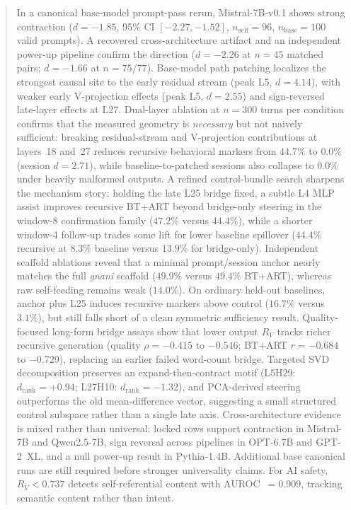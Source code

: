 \documentclass{article}
\newcommand{\RV}{R_V}
\newcommand{\dcohen}{d}
\begin{document}
\begin{abstract}
In a canonical base-model prompt-pass rerun, Mistral-7B-v0.1 shows strong contraction
($\dcohen = -1.85$, 95\% CI $[-2.27, -1.52]$, $n_\mathrm{self}=96$, $n_\mathrm{base}=100$ valid prompts).
A recovered cross-architecture artifact and an independent power-up pipeline confirm the direction
($\dcohen = -2.26$ at $n = 45$ matched pairs; $\dcohen = -1.66$ at $n = 75/77$).
Base-model path patching localizes the strongest causal site to the early residual stream
(peak L5, $\dcohen = 4.14$), with weaker early V-projection effects
(peak L5, $\dcohen = 2.55$) and sign-reversed late-layer effects at L27.
Dual-layer ablation at $n{=}300$ turns per condition confirms that the measured geometry is
\emph{necessary} but not naively sufficient: breaking residual-stream and V-projection contributions
at layers~18 and~27 reduces recursive behavioral markers from $44.7\%$ to $0.0\%$
(session $\dcohen = 2.71$), while baseline-to-patched sessions also collapse to $0.0\%$
under heavily malformed outputs.
A refined control-bundle search sharpens the mechanism story:
holding the late L25 bridge fixed, a subtle L4 MLP assist improves recursive BT+ART beyond
bridge-only steering in the window-8 confirmation family
($47.2\%$ versus $44.4\%$), while a shorter window-4 follow-up trades some lift for lower
baseline spillover ($44.4\%$ recursive at $8.3\%$ baseline versus $13.9\%$ for bridge-only).
Independent scaffold ablations reveal that a minimal prompt/session anchor nearly matches the full
\emph{gnani} scaffold ($49.9\%$ versus $49.4\%$ BT+ART), whereas raw self-feeding remains weak
($14.0\%$).
On ordinary held-out baselines, anchor plus L25 induces recursive markers above control
($16.7\%$ versus $3.1\%$), but still falls short of a clean symmetric sufficiency result.
Quality-focused long-form bridge assays show that lower output $\RV$ tracks richer recursive
generation (quality $\rho = -0.415$ to $-0.546$; BT+ART $r = -0.684$ to $-0.729$), replacing an
earlier failed word-count bridge.
Targeted SVD decomposition preserves an expand-then-contract motif
(L5H29: $\dcohen_{\mathrm{rank}} = +0.94$; L27H10: $\dcohen_{\mathrm{rank}} = -1.32$), and
PCA-derived steering outperforms the old mean-difference vector, suggesting a small structured
control subspace rather than a single late axis.
Cross-architecture evidence is mixed rather than universal: locked rows support contraction in
Mistral-7B and Qwen2.5-7B, sign reversal across pipelines in OPT-6.7B and GPT-2~XL, and a null
power-up result in Pythia-1.4B.
Additional base canonical runs are still required before stronger universality claims.
For AI safety, $\RV < 0.737$ detects self-referential content with AUROC~$= 0.909$,
tracking semantic content rather than intent.
\end{abstract}
\end{document}
